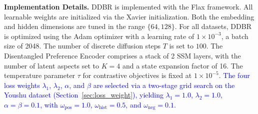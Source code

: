 \documentclass[lettersize,journal]{IEEEtran}
\newcommand{\revise}[1]{\textcolor{blue}{#1}}
\begin{document}
\begin{table}[t]
\centering
\Huge
\caption{Information access comparison across methods at inference time. $\checkmark$ = required, $\checkmark^*$ = used only during training, $\times$ = not required.}
\label{tab:info_access}
\end{table}

\noindent\textbf{Implementation Details.}
DDBR is implemented with the Flax framework. All learnable weights are initialized via the Xavier initialization. Both the embedding and hidden dimensions are tuned in the range $\{64, 128\}$. For all datasets, DDBR is optimized using the Adam optimizer with a learning rate of $1 \times 10^{-3}$, a batch size of 2048. The number of discrete diffusion steps $T$ is set to $100$. The Disentangled Preference Encoder comprises a stack of 2 SSM layers, with the number of latent aspects set to $K=4$ and a state expansion factor of 16.
The temperature parameter $\tau$ for contrastive objectives is fixed at $1 \times 10^{-5}$. \revise{The four loss weights $\lambda_1$, $\lambda_2$, $\alpha$, and $\beta$ are selected via a two-stage grid search on the Youshu dataset (Section~\ref{sec:loss_weight}), yielding $\lambda_1=1.0$, $\lambda_2=1.0$, $\alpha=\beta=0.1$, with $\omega_{\text{pos}}=1.0$, $\omega_{\text{hist}}=0.5$, and $\omega_{\text{neg}}=0.1$.}
\end{document}
